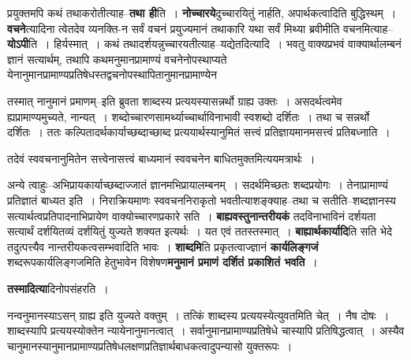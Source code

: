 \documentclass[article,12pt,a4paper]{memoir}
\begin{document}
	  \pstart प्रयुक्तमपि कथं तथाकरोतीत्याह--\textbf{तथा ही}ति । \textbf{नोच्चारये}दुच्चारयितुं नार्हति, अपार्थकत्वादिति बुद्धिस्थम् । \textbf{वचने}त्यादिना त्वेतदेव व्यनक्ति-न सर्वं वचनं प्रयुज्यमानं तथाकारि यथा सर्वं मिथ्या ब्रवीमीति वचनमित्याह--\textbf{योऽपी}ति । हिर्यस्मात् । कथं तथादर्शयन्नुच्चारयतीत्याह--यद्येतदित्यादि । भवतु वाक्यप्रभवं वाक्यार्थालम्बनं ज्ञानं सत्यार्थम्, तथापि कथमनुमानप्रामाण्यं वचनेनोपस्थाप्यते येनानुमानप्रामाण्यप्रतिषेधस्तद्वचनोपस्थापितानुमानप्रामाण्येन  \leavevmode{} 
	  
	तस्मात् नानुमानं प्रमाणम्--इति ब्रुवता शाब्दस्य प्रत्ययस्यासन्नर्थो ग्राह्य उक्तः । असदर्थत्वमेव ह्यप्रामाण्यमुच्यते, नान्यत् । शब्दोच्चारणसामर्थ्याच्चार्थाविनाभावी स्वशब्दो दर्शितः । तथा च सन्नर्थो दर्शितः । ततः कल्पितादर्थकार्याच्छब्दाच्छाब्द प्रत्ययार्थस्यानुमितं सत्त्वं प्रतिज्ञायमानमसत्त्वं प्रतिबध्नाति ।  
	  
	तदेवं स्ववचनानुमितेन सत्त्वेनासत्त्वं बाध्यमानं स्ववचनेन बाधितमुक्तमित्ययमत्रार्थः ।  
	  
	अन्ये त्वाहुः--अभिप्रायकार्याच्छब्दाज्जातं ज्ञानमभिप्रायालम्बनम् । सदर्थमिच्छतः शब्दप्रयोगः । तेनाप्रामाण्यं प्रतिज्ञातं बाध्यत इति । निराक्रियमाणः स्ववचननिराकृतो भवतीत्याशङ्क्याह--तथा च सतीति--शब्दज्ञानस्य सत्यार्थत्वप्रतिपादनाभिप्रायेण वाक्योच्चारणप्रकारे सति । \textbf{बाह्यवस्तुनान्तरीयकं} तदविनाभाविनं दर्शयता सत्यार्थं दर्शयितव्यं दर्शयितुं युज्यते शक्यत इत्यर्थः । यत एवं ततस्तस्मात् । \textbf{बाह्यार्थकार्यादि}ति सति भेदे तदुत्पत्त्यैव नान्तरीयकत्वसम्भवादिति भावः । \textbf{शाब्दमि}ति प्रकृतत्वाज्ज्ञानं \textbf{कार्यलिङ्गजं} शब्दरूपकार्यलिङ्गजमिति हेतुभावेन विशेषण\textbf{मनुमानं प्रमाणं दर्शितं प्रकाशितं भवति} ।
	\pend
      

	  \pstart \textbf{तस्मादित्या}दिनोपसंहरति ।
	\pend
      

	  \pstart नन्वनुमानस्याऽसन् ग्राह्य इति युज्यते वक्तुम् । तत्किं शाब्दस्य प्रत्ययस्येत्युवतमिति चेत् । नैष दोषः । शाब्दस्यापि प्रत्ययस्योक्तेन न्यायेनानुमानत्वात् । सर्वानुमानप्रामाण्यप्रतिषेधे चास्यापि प्रतिषिद्धत्वात् । अस्यैव चानुमानस्यानुमानप्रामाण्यप्रतिषेधलक्षणप्रतिज्ञार्थबाधकत्वादुपन्यासो युक्तरूपः ।
	\pend
      
\end{document}
